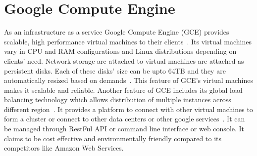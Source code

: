 \section{Google Compute Engine}

As an infrastructure as a service Google Compute Engine (GCE) provides scalable, 
high performance  virtual machines to their clients~\cite{hid-sp18-415-cloud-google}. 
Its virtual machines vary in CPU and RAM configurations  and Linux distributions 
depending on clients' need. Network storage are attached to virtual machines are 
attached as persistent disks. Each of these disks' size can be upto 64TB and 
they are automatically resized based on demands~\cite{hid-sp18-415-cloud-google}. 
This feature of GCE's virtual machines makes it scalable and reliable. Another 
feature of GCE includes its global load balancing technology which allows 
distribution of multiple instances across different region~\cite{hid-sp18-415-cloud-google}. 
It provides a platform to connect with other virtual machines to form a cluster or 
connect to other data centers or other google services~\cite{hid-sp18-415-cloud-google}. 
It can be managed through RestFul API or command line interface or web console. 
It claims to be cost effective and environmentally friendly compared to its 
competitors like Amazon Web Services.
